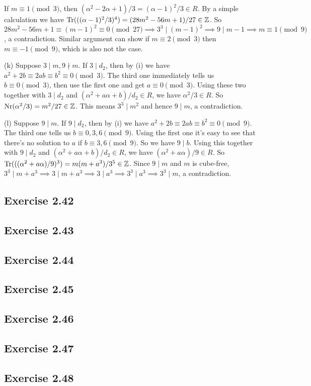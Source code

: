 \documentclass[../Marcus.tex]{subfiles}
\begin{document}
If $m\equiv 1\pmod{3}$, then $(\alpha^2-2\alpha+1)/3=(\alpha-1)^2/3\in R$. By a simple calculation we have $\operatorname{Tr}(((\alpha-1)^2/3)^4) = (28m^2-56m+1)/27\in\mathbb{Z}$. So $28m^2-56m+1\equiv (m-1)^2 \equiv 0\pmod{27}\implies 3^3\mid (m-1)^2\implies 9\mid m-1\implies m\equiv 1\pmod{9}$, a contradiction. Similar argument can show if $m\equiv 2\pmod{3}$ then $m\equiv -1\pmod{9}$, which is also not the case.

(k) Suppose $3\mid m,9\nmid m$. If $3\mid d_2$, then by (i) we have $a^2+2b\equiv 2ab\equiv b^2 \equiv 0 \pmod{3}$. The third one immediately tells us $b\equiv 0\pmod{3}$, then use the first one and get $a\equiv 0\pmod{3}$. Using these two together with $3\mid d_2$ and $(\alpha^2+a\alpha+b)/d_2\in R$, we have $\alpha^2/3\in R$. So $\operatorname{Nr}(\alpha^2/3)=m^2/27\in\mathbb{Z}$. This means $3^3\mid m^2$ and hence $9\mid m$, a contradiction.

(l) Suppose $9\mid m$. If $9\mid d_2$, then by (i) we have $a^2+2b\equiv 2ab\equiv b^2 \equiv 0 \pmod{9}$. The third one tells us $b\equiv 0,3,6\pmod{9}$. Using the first one it's easy to see that there's no solution to $a$ if $b\equiv 3,6\pmod{9}$. So we have $9\mid b$. Using this together with $9\mid d_2$ and $(\alpha^2+a\alpha+b)/d_2\in R$, we have $(\alpha^2+a\alpha)/9\in R$. So $\operatorname{Tr}(((\alpha^2+a\alpha)/9)^3)=m(m+a^3)/3^5\in\mathbb{Z}$. Since $9\mid m$ and $m$ is cube-free, $3^3\mid m+a^3 \implies 3\mid m+a^3 \implies 3\mid a^3 \implies 3^3\mid a^3 \implies 3^3\mid m$, a contradiction.

\subsection*{Exercise 2.42}

\subsection*{Exercise 2.43}

\subsection*{Exercise 2.44}

\subsection*{Exercise 2.45}

\subsection*{Exercise 2.46}

\subsection*{Exercise 2.47}

\subsection*{Exercise 2.48}
\phantom{}
\end{document}
